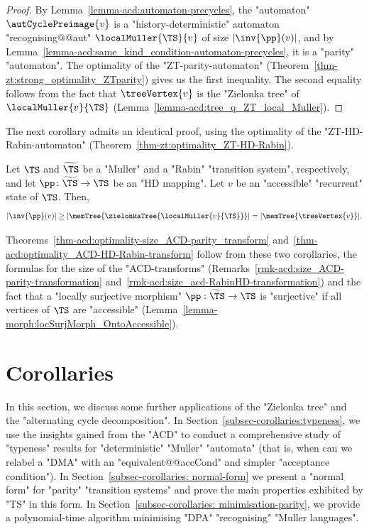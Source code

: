 \documentclass{theoretics}
\begin{document}
\begin{proof}
	By Lemma~\ref{lemma-acd:automaton-precycles}, the "automaton" $\autCyclePreimage{v}$ is a "history-deterministic" automaton "recognising@@aut" $\localMuller{\TS}{v}$ of size $|\inv{\pp}(v)|$, and by Lemma~\ref{lemma-acd:same_kind_condition-automaton-precycles}, it is a "parity" "automaton". The optimality of the "ZT-parity-automaton" (Theorem~\ref{thm-zt:strong_optimality_ZTparity}) gives us the first inequality. The second equality follows from the fact that $\treeVertex{v}$ is the "Zielonka tree" of $\localMuller{v}{\TS}$ (Lemma~\ref{lemma-acd:tree_q_ZT_local_Muller}).
\end{proof}

The next corollary admits an identical proof, using the optimality of the "ZT-HD-Rabin-automaton" (Theorem~\ref{thm-zt:optimality_ZT-HD-Rabin}).
\begin{corollary}
	Let $\TS$ and $\widetilde{\TS}$ be a "Muller" and a "Rabin" "transition system", respectively, and let $\pp \colon \widetilde{\TS} \to \TS$ be an "HD mapping". Let $v$ be an "accessible" "recurrent" state of $\TS$. Then,
	\[ |\inv{\pp}(v)| \geq |\memTree{\zielonkaTree{\localMuller{v}{\TS}}}| = |\memTree{\treeVertex{v}}|.\]
\end{corollary}

Theorems~\ref{thm-acd:optimality-size_ACD-parity_transform} and~\ref{thm-acd:optimality_ACD-HD-Rabin-transform} follow from these two corollaries, the formulas for the size of the "ACD-transforms" (Remarks~\ref{rmk-acd:size_ACD-parity-transformation} and~\ref{rmk-acd:size_acd-RabinHD-transformation}) and the fact that a "locally surjective morphism" $\pp:\widetilde{\TS} \to \TS$  is "surjective" if all vertices of $\TS$ are "accessible" (Lemma~\ref{lemma-morph:locSurjMorph_OntoAccessible}).


 	
	\section{Corollaries}\label{section:corollaries}
	In this section, we discuss some further applications of the "Zielonka tree" and the "alternating cycle decomposition".
In Section~\ref{subsec-corollaries:typeness}, we use the insights gained from the "ACD" to conduct a comprehensive study of "typeness" results for "deterministic" "Muller" "automata" (that is, when can we relabel a "DMA" with an "equivalent@@accCond" and simpler "acceptance condition").
In Section~\ref{subsec-corollaries: normal-form} we present a "normal form" for "parity" "transition systems" and prove the main properties exhibited by "TS" in this form.
In Section~\ref{subsec-corollaries: minimisation-parity}, we provide a polynomial-time algorithm minimising "DPA" "recognising" "Muller languages".
\end{document}
